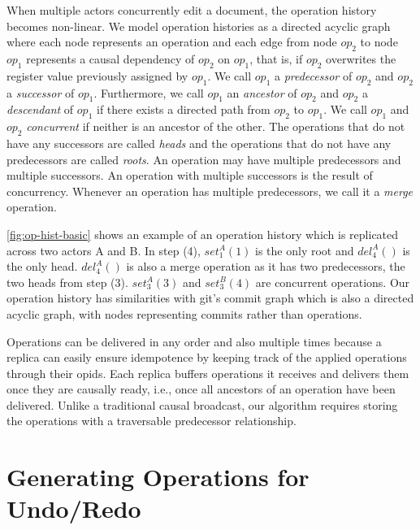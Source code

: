 \documentclass[sigplan,natbib=false,review]{acmart}
\newcommand{\op}[3][op]{$\mathit{#1}_{#2}^{#3}$} %
\newcommand{\setop}[4][set]{$\mathit{#1_{#2}^{#3}}{(#4)}$}
\newcommand{\delop}[3][del]{$\mathit{#1_{#2}^{#3}}{()}$}
\begin{document}
When multiple actors concurrently edit a document, the operation history becomes
non-linear.
We model operation histories as a directed acyclic graph
where each node represents an operation and 
each edge from node \op{2}{} to node \op{1}{}
represents a causal dependency of \op{2}{} on \op{1}{}, that is, if
\op{2}{} overwrites the register value previously assigned by \op{1}{}.
We call \op{1}{} a \emph{predecessor} of \op{2}{} and
\op{2}{} a \emph{successor} of \op{1}{}.
Furthermore, we call \op{1}{} an \emph{ancestor} of \op{2}{} and
\op{2}{} a \emph{descendant} of \op{1}{} if there exists a directed
path from \op{2}{} to \op{1}{}.
We call \op{1}{} and \op{2}{} \emph{concurrent} if neither is an ancestor of the
other.
The operations that do not have any successors are called \emph{heads} and
the operations that do not have any predecessors are called \emph{roots}.
An operation may have multiple predecessors and multiple successors.
An operation with multiple successors is the result of concurrency.
Whenever an operation has multiple predecessors, we call it a \emph{merge} operation.

\autoref{fig:op-hist-basic} shows an example of an operation history which is
replicated across two actors A and B.
In step (4), \setop{1}{A}{1} is the only root and \delop{4}{A} is the only head.
\delop{4}{A} is also a merge operation as it has two predecessors, the two
heads from step (3).
\setop{3}{A}{3} and \setop{3}{B}{4} are concurrent operations.
Our operation history has similarities with git's commit graph which is also
a directed acyclic graph, with nodes representing commits
rather than operations.

Operations can be delivered in any order and also multiple
times because a replica can easily ensure idempotence by
keeping track of the applied operations through their \glspl*{opid}.
Each replica buffers operations it receives and delivers them
once they are causally ready, i.e., once all ancestors of an operation
have been delivered.
Unlike a traditional causal broadcast,
our algorithm requires storing the operations with a traversable predecessor relationship.

\section{Generating Operations for Undo/Redo}\label{sec:overview}
\end{document}
